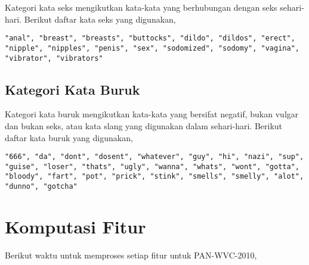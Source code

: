 Kategori kata seks mengikutkan kata-kata yang berhubungan dengan seks
sehari-hari.
Berikut daftar kata seks yang digunakan,

\begin{lstlisting}
"anal", "breast", "breasts", "buttocks", "dildo", "dildos", "erect",
"nipple", "nipples", "penis", "sex", "sodomized", "sodomy", "vagina",
"vibrator", "vibrators"
\end{lstlisting}

\subsection{Kategori Kata Buruk}
\label{appendix:words_bad}

Kategori kata buruk mengikutkan kata-kata yang bersifat negatif, bukan vulgar
dan bukan seks, atau kata slang yang digunakan dalam sehari-hari.
Berikut daftar kata buruk yang digunakan,

\begin{lstlisting}
"666", "da", "dont", "dosent", "whatever", "guy", "hi", "nazi", "sup",
"guise", "loser", "thats", "ugly", "wanna", "whats", "wont", "gotta",
"bloody", "fart", "pot", "prick", "stink", "smells", "smelly", "alot",
"dunno", "gotcha"
\end{lstlisting}

\newpage
\section{Komputasi Fitur}
\label{appendix:features_computation}

Berikut waktu untuk memproses setiap fitur untuk PAN-WVC-2010,


